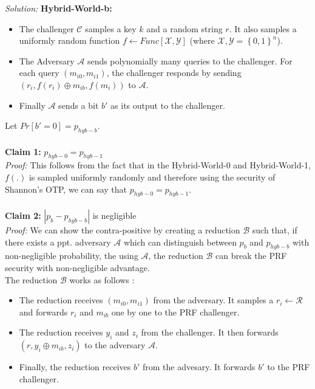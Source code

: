 \documentclass[a4paper, 11pt]{article}
\newenvironment{solution}
    {\textit{Solution:}}
    {\clearpage}
\newcommand{\bit}{\left\{0, 1\right\}}
\newcommand{\calA}{\mathcal{A}}
\newcommand{\calB}{\mathcal{B}}
\newcommand{\calC}{\mathcal{C}}
\newcommand{\calX}{\mathcal{X}}
\newcommand{\calY}{\mathcal{Y}}
\newcommand{\calR}{\mathcal{R}}
\begin{document}
\begin{solution}
    \textbf{Hybrid-World-b:} 
        \begin{itemize}
            \item The challenger $\calC$ samples a key $k$ and a random string $r$. It also samples a uniformly random function $f \leftarrow Func[\calX, \calY]$ (where $\calX, \calY = \bit^n$).
            \item The Adversary $\calA$ sends polynomially many queries to the challenger. For each query $(m_{i0}, m_{i1})$, the challenger responds by sending $(r_i, f(r_i) \oplus m_{ib}, f(m_i))$ to $\calA$.
            \item Finally $\calA$ sends a bit $b'$ as its output to the challenger.
        \end{itemize}
    Let $Pr[b' = 0] = p_{hyb-b}$. \\ \\
    \textbf{Claim 1:} $p_{hyb-0} = p_{hyb-1}$ \\
    \textit{Proof:} This follows from the fact that in the Hybrid-World-0 and Hybrid-World-1, $f(.)$ is sampled uniformly randomly and therefore using the security of Shannon's OTP, we can say that $p_{hyb-0} = p_{hyb-1}$.\\ \\ 
    \textbf{Claim 2:} $| p_{b} - p_{hyb-b} |$ is negligible \\
    \textit{Proof:} We can show the contra-positive by creating a reduction $\calB$ such that, if there exists a ppt. adversary $\calA$ which can distinguish between $p_{b}$ and $p_{hyb-b}$ with non-negligible probability, the using $\calA$, the reduction $\calB$ can break the PRF security with non-negligible advantage.\\
    The reduction $\calB$ works as follows : 
    \begin{itemize}
        \item The reduction receives $(m_{i0}, m_{i1})$ from the adversary. It samples a $r_i \leftarrow \calR$ and forwards $r_i$ and $m_{ib}$ one by one to the PRF challenger.
        \item The reduction receives $y_i$ and $z_i$ from the challenger. It then forwards $(r, y_i \oplus m_{ib}, z_i)$ to the adversary $\calA$.
        \item Finally, the reduction receives $b'$ from the advesary. It forwards $b'$ to the PRF challenger.

\end{itemize}
\end{solution}
\end{document}
